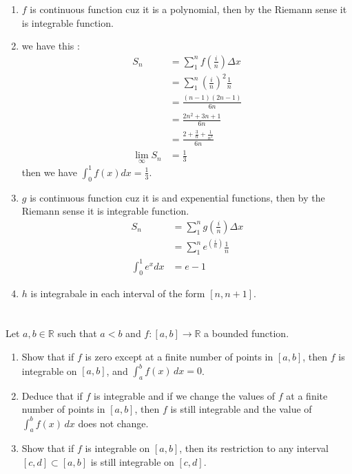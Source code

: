 \documentclass[12pt]{article}
\begin{document}
\begin{correctionbox}
	\begin{enumerate}
		\item $f$ is continuous function cuz it is a polynomial, then by the Riemann sense it is integrable function.
		\item we have this :
		      $$
			      \begin{align*}
				      S_n               & = \sum_{1}^{n} f(\frac{i}{n}) \Delta x                \\
				                        & = \sum_{1}^{n} \left(\frac{i}{n}\right)^2 \frac{1}{n} \\
				                        & = \frac{(n-1)(2n-1)}{6n}                              \\
				                        & = \frac{2n^2 + 3n +1}{6n}                             \\
				                        & = \frac{2+\frac{3}{n}+\frac{1}{n^2}}{6n}              \\
				      \lim_{\infty}	S_n & = \frac{1}{3}
			      \end{align*}
		      $$ then we have $\int_{0}^{1}f(x) dx = \frac{1}{3}$.
		\item  $g$ is continuous function cuz it is and expenential functions, then by the Riemann sense it is integrable function.
		      \begin{align*}
			      S_n                & = \sum_{1}^{n} g(\frac{i}{n}) \Delta x                  \\
			                         & = \sum_{1}^{n} e^{\left(\frac{i}{n}\right)} \frac{1}{n} \\
			      \int_{0}^{1}e^x dx & = e -1
		      \end{align*}
		\item $h$ is integrabale in each interval of the form $[n,n+1]$.
	\end{enumerate}
\end{correctionbox}

\section{}
Let $a, b \in \mathbb{R}$ such that $a < b$ and $f: [a, b] \rightarrow \mathbb{R}$ a bounded function.

\begin{enumerate}
	\item Show that if $f$ is zero except at a finite number of points in $[a, b]$, then $f$ is integrable on $[a, b]$, and $\int_a^b f(x) \, dx = 0$.
	\item Deduce that if $f$ is integrable and if we change the values of $f$ at a finite number of points in $[a, b]$, then $f$ is still integrable and the value of $\int_a^b f(x) \, dx$ does not change.
	\item Show that if $f$ is integrable on $[a, b]$, then its restriction to any interval $[c, d] \subset [a, b]$ is still integrable on $[c, d]$.
\end{enumerate}
\end{document}
